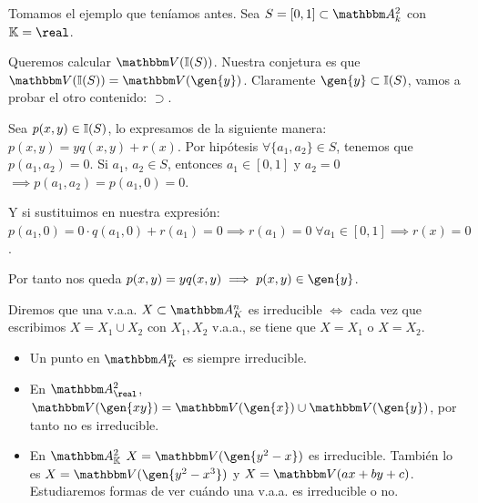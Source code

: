 \begin{example}
	Tomamos el ejemplo que teníamos antes. Sea $S=[0,1] \subset \A_k^2$ con $\K=\real$.
	
	\begin{figure}
		\centering
	\end{figure}
		
		Queremos calcular $\V(\I(S))$. Nuestra conjetura es que $\V(\I(S))=\V(\gen{y})$. Claramente $\gen{y} \subset \I(S)$, vamos a probar el otro contenido: $\supset$.
		
		Sea $p(x,y) \in \mathbb{I}(S)$, lo expresamos de la siguiente manera: $p(x,y)=yq(x,y)+r(x)$. Por hipótesis $\forall\{a_1,a_2\} \in S$, tenemos que $p(a_1,a_2)=0$. Si $a_1$, $a_2 \in S$, entonces $a_1 \in [0,1]$ y $a_2=0$ $\implies p(a_1,a_2)=p(a_1,0)=0$.
		
		Y si sustituimos en nuestra expresión: $p(a_1,0)=0\cdot q(a_1,0)+r(a_1)=0 \implies r(a_1)=0 \; \forall a_1 \in [0,1] \implies r(x)=0$.
		
		Por tanto nos queda $p(x,y)=yq(x,y) \implies p(x,y) \in \gen{y}$.
\end{example}

\begin{defn}[v.a.a. irreducible]
	Diremos que una v.a.a. $X \subset \A^n_K$ es irreducible $\Leftrightarrow$ cada vez que escribimos $X=X_1 \cup X_2$ con $X_1, X_2$ v.a.a., se tiene que $X=X_1$ o $X=X_2$.
\end{defn}

\begin{example}
	\begin{itemize}
	\item Un punto en $\A_K^n$ es siempre irreducible.
	\item En $\A^2_{\real}$, $\V(\gen{xy})=\V(\gen{x}) \cup \V(\gen{y})$, por tanto no es irreducible.
	\item En $\A^2_{\K}$ $X=\V(\gen{y^2-x})$ es irreducible. También lo es $X=\V(\gen{y^2-x^3})$ y $X=\V(ax+by+c)$. Estudiaremos formas de ver cuándo una v.a.a. es irreducible o no.
	\end{itemize}
\end{example}

